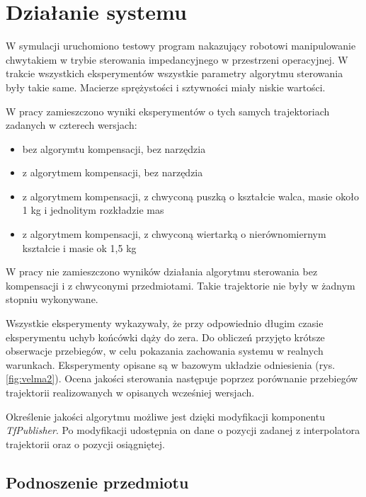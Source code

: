 
\chapter{Działanie systemu\label{chap:weryfikacja_systemu}}
\graphicspath{{../../velma/przerobione_testy/out/}{./images}}

W symulacji uruchomiono testowy program  nakazujący robotowi manipulowanie chwytakiem w trybie sterowania impedancyjnego w przestrzeni operacyjnej.  W trakcie wszystkich eksperymentów wszystkie parametry algorytmu sterowania były takie same. Macierze sprężystości i sztywności miały niskie wartości. 


W pracy zamieszczono wyniki eksperymentów o tych samych trajektoriach zadanych w czterech wersjach:
\begin{itemize}
	\item bez algorymtu kompensacji, bez narzędzia
	\item z algorytmem kompensacji, bez narzędzia
	\item z algorytmem kompensacji, z chwyconą puszką o kształcie walca, masie około 1 kg i jednolitym rozkładzie mas
	\item z algorytmem kompensacji, z chwyconą wiertarką o nierównomiernym kształcie i masie ok 1,5 kg
\end{itemize}
 W pracy nie zamieszczono wyników działania algorytmu sterowania bez kompensacji i z chwyconymi przedmiotami. Takie trajektorie nie były  w żadnym stopniu wykonywane. 
 
Wszystkie eksperymenty wykazywały, że przy odpowiednio długim czasie eksperymentu uchyb końcówki dąży do zera. Do obliczeń przyjęto krótsze obserwacje przebiegów, w celu pokazania zachowania systemu w realnych warunkach.  Eksperymenty opisane są w bazowym układzie odniesienia (rys. \ref{fig:velma2}).  Ocena jakości sterowania następuje poprzez porównanie przebiegów trajektorii realizowanych w opisanych wcześniej wersjach.

Określenie jakości algorytmu możliwe jest dzięki modyfikacji komponentu \textit{TfPublisher}. Po modyfikacji udostępnia on dane o pozycji zadanej z interpolatora trajektorii oraz o pozycji osiągniętej. 


\section{Podnoszenie przedmiotu}

